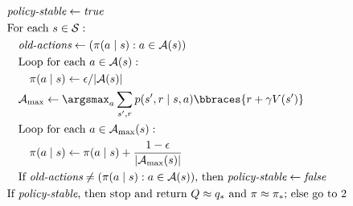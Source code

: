\begin{solution}
\begin{tcolorbox}[title = Policy Iteration (using iterative policy evaluation) for estimating $\pi \approx \pi_\ast$]
\begin{enumerate}[label = \arabic*.]
        \begin{align*}
            & \textit{policy-stable} \leftarrow \textit{true} \\
            & \text{For each $s \in \mathcal S$}: \\
            & \quad \textit{old-actions} \leftarrow (\pi(a \mid s): a \in \mathcal A(s)) \\
            & \quad \text{Loop for each $a \in \mathcal A(s)$}: \\
            & \quad \quad \pi(a \mid s) \leftarrow \epsilon / |\mathcal A(s)| \\
            & \quad \mathcal A_\text{max} \leftarrow \argsmax_a \sum_{s^\prime, r} p(s^\prime, r \mid s, a) \bbraces{r + \gamma V(s^\prime)} \\
            & \quad \text{Loop for each $a \in \mathcal A_\text{max}(s)$}: \\
            & \quad \quad \pi(a \mid s) \leftarrow \pi(a \mid s) + \frac{1 - \epsilon}{|\mathcal A_\text{max}(s)|} \\
            & \quad \text{If $\textit{old-actions} \neq (\pi(a \mid s): a \in \mathcal A(s))$, then $\textit{policy-stable} \leftarrow \textit{false}$} \\
            & \text{If $\textit{policy-stable}$, then stop and return $Q \approx q_\ast$ and $\pi \approx \pi_\ast$; else go to $2$}
        \end{align*}

    \end{enumerate}

\end{tcolorbox}

\end{solution}

